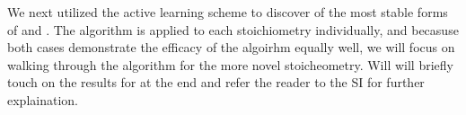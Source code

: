 %



%
We next utilized the active learning scheme to discover of the most stable forms of \IrOtwo and \IrOthree.
%
The algorithm is applied to each stoichiometry individually, and becasuse both cases demonstrate the efficacy of the algoirhm equally well, we will focus on walking through the algorithm for the more novel \IrOthree stoicheometry.
%
Will will briefly touch on the results for \IrOtwo at the end and refer the reader to the SI for further explaination.

